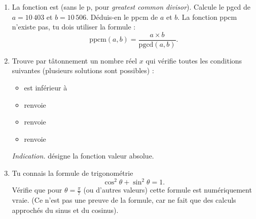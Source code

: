 \documentclass[11pt,class=report,crop=false]{standalone}
\begin{document}
\begin{activite}


\begin{enumerate}
  \item  La fonction \Python{} est  (sans le \og{}p\fg{}, pour \emph{greatest common divisor}). Calcule le pgcd de $a = 10\,403$ et $b = 10\,506$. Déduis-en le ppcm de $a$ et $b$. La fonction ppcm n'existe pas, tu dois utiliser la formule :
  $$\text{ppcm}(a,b) = \frac{a \times b}{\text{pgcd}(a,b)}.$$
  
  \item Trouve par tâtonnement un nombre réel $x$ qui vérifie toutes les conditions suivantes (plusieurs solutions sont possibles) :
  \begin{itemize}
    \item {} est inférieur à 
    \item {} renvoie 
    \item {} renvoie 
    \item {} renvoie  
  \end{itemize}
 
  \emph{Indication.}  désigne la fonction valeur absolue.
  
  \item Tu connais la formule de trigonométrie 
  $$\cos^2 \theta + \sin^2 \theta = 1.$$
  Vérifie que pour $\theta = \frac\pi7$ (ou d'autres valeurs) cette formule est numériquement vraie. (Ce n'est pas une preuve de la formule, car \Python{} ne fait que des calculs approchés du sinus et du cosinus).
\end{enumerate}  
\end{activite}

\end{document}
